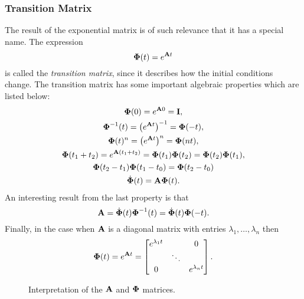 \subsubsection{Transition Matrix}

The result of the exponential matrix is of such relevance that it has a special name. The expression
\[
	\bm{\mathrm{\Phi}}(t) = e^{\bm{\mathrm{A}} t}
\]
is called the \emph{transition matrix}, since it describes how the initial conditions change. The transition matrix has some important algebraic properties which are listed below:
\begin{gather*}
	\bm{\mathrm{\Phi}}(0)
		= e^{\bm{\mathrm{A}} 0}
		= \bm{\mathrm{I}}, \\
	\bm{\mathrm{\Phi}}^{-1}(t)
		= \left(e^{\bm{\mathrm{A}}t}\right)^{-1}
		= \bm{\mathrm{\Phi}}(-t), \\
	\bm{\mathrm{\Phi}}(t)^{n}
		= \left(e^{\bm{\mathrm{A}}t}\right)^{n}
		= \bm{\mathrm{\Phi}}(nt), \\
	\bm{\mathrm{\Phi}}(t_1 + t_2)
		= e^{\bm{\mathrm{A}}(t_1 + t_2)}
		= \bm{\mathrm{\Phi}}(t_1) \bm{\mathrm{\Phi}}(t_2)
		= \bm{\mathrm{\Phi}}(t_2) \bm{\mathrm{\Phi}}(t_1), \\
	\bm{\mathrm{\Phi}}(t_2 - t_1) \bm{\mathrm{\Phi}}(t_1 - t_0)
		= \bm{\mathrm{\Phi}}(t_2 - t_0)
		\\
	\dot{\bm{\mathrm{\Phi}}}(t) = \bm{\mathrm{A}}\bm{\mathrm{\Phi}}(t)
	.
\end{gather*}
An interesting result from the last property is that
\[
	\bm{\mathrm{A}} = \dot{\bm{\mathrm{\Phi}}}(t) \bm{\mathrm{\Phi}}^{-1}(t)
	= \dot{\bm{\mathrm{\Phi}}}(t) \bm{\mathrm{\Phi}}(-t).
\]
Finally, in the case when \(\bm{\mathrm{A}}\) is a diagonal matrix with entries \(\lambda_1, \ldots, \lambda_n\) then
\[
	\bm{\mathrm{\Phi}}(t) = e^{\bm{\mathrm{A}} t} = \begin{bmatrix}
		e^{\lambda_1 t} & & 0 \\
		& \ddots \\
		0 & & e^{\lambda_n t}
	\end{bmatrix}.
\]

\begin{figure}
	\centering
	\caption{
		Interpretation of the \(\bm{\mathrm{A}}\) and \(\bm{\mathrm{\Phi}}\) matrices.
		\label{fig:ss-matrix-interp}
	}
\end{figure}


